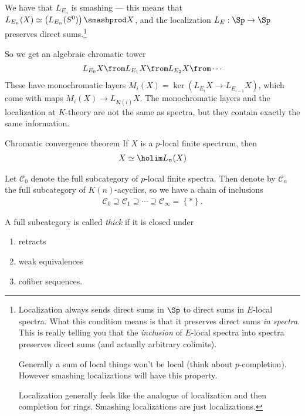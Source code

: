 \begin{fact} We have that $L_{E_n}$ is smashing --- this means that $L_{E_n}(X) \simeq \left( L_{E_n}(S^0) \right) \smashprod X$, and the localization $L_E: \Sp \to \Sp$ preserves direct sums.\footnote{Localization always sends direct sums in $\Sp$ to direct sums in $E$-local spectra. What this condition means is that it preserves direct sums \textit{in spectra}. This is really telling you that the \textit{inclusion} of $E$-local spectra into spectra preserves direct sums (and actually arbitrary colimits).

Generally a sum of local things won't be local (think about $p$-completion). However smashing localizations will have this property.

Localization generally feels like the analogue of localization and then completion for rings. Smashing localizations are just localizations.}
\end{fact}

So we get an algebraic chromatic tower
\begin{align*}
    L_{E_0} X \from L_{E_1} X \from L_{E_2} X \from \cdots 
\end{align*}
These have monochromatic layers $M_i(X) = \ker \left( L_{E_i} X \to L_{E_{i-1}} X \right)$, which come with maps $M_i(X) \to L_{K(i)} X$. The monochromatic layers and the localization at $K$-theory are not the same as spectra, but they contain exactly the same information.

\begin{customenvironment}{Chromatic convergence theorem} If $X$ is a $p$-local finite spectrum, then
\begin{align*}
    X \simeq \holim L_n(X)
\end{align*}
\end{customenvironment}

\begin{fact} Let $\mathscr{C}_0$ denote the full subcategory of $p$-local finite spectra. Then denote by $\mathscr{C}_n$ the full subcategory of $K(n)$-acyclics, so we have a chain of inclusions
\begin{align*}
    \mathscr{C}_0 \supseteq \mathscr{C}_1 \supseteq \cdots \supseteq \mathscr{C}_\infty = \left\{ \ast \right\}.
\end{align*}
\end{fact}

A full subcategory is called \textit{thick} if it is closed under 
\begin{enumerate}
    \item retracts
    \item weak equivalences
    \item cofiber sequences.
\end{enumerate}

